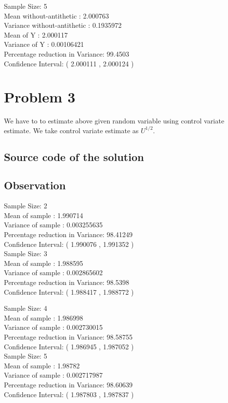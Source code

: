 \documentclass{article}
\begin{document}
Sample Size:  5 \\
Mean without-antithetic :  2.000763 \\
Variance without-antithetic :  0.1935972 \\
Mean of Y :  2.000117 \\
Variance of Y :  0.00106421 \\
Percentage reduction in Variance:  99.4503  \\
Confidence Interval: ( 2.000111  ,  2.000124 )\\
		
		
		\pagebreak
		
		
	    \section{Problem 3}
	    \paragraph{}
		We have to to estimate above given random variable using control variate estimate.
		We take control variate estimate as $U^{1/2}$.
	
		
		\subsection{Source code of the solution}
		
		
		\subsection{Observation}
		Sample Size:  2 \\
Mean of sample :  1.990714 \\
Variance of sample :  0.003255635 \\
Percentage reduction in Variance:  98.41249  \\
Confidence Interval: ( 1.990076  ,  1.991352 ) \\

Sample Size:  3 \\
Mean of sample :  1.988595 \\
Variance of sample :  0.002865602 \\
Percentage reduction in Variance:  98.5398  \\
Confidence Interval: ( 1.988417  ,  1.988772 ) \\

\pagebreak

Sample Size:  4 \\
Mean of sample :  1.986998 \\
Variance of sample :  0.002730015 \\
Percentage reduction in Variance:  98.58755  \\
Confidence Interval: ( 1.986945  ,  1.987052 ) \\

Sample Size:  5 \\
Mean of sample :  1.98782 \\
Variance of sample :  0.002717987 \\
Percentage reduction in Variance:  98.60639  \\
Confidence Interval: ( 1.987803  ,  1.987837 )\\

	
		
\end{document}
